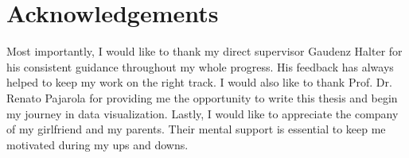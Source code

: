 \documentclass[11pt, a4paper,oneside,chapterprefix=false]{scrbook}
\begin{document}
\chapter*{Acknowledgements}
Most importantly, I would like to thank my direct supervisor Gaudenz Halter for his consistent guidance throughout my whole progress. His feedback has always helped to keep my work on the right track. I would also like to thank Prof. Dr. Renato
Pajarola for providing me the opportunity to write this thesis and begin my journey in data visualization. Lastly, I would like to appreciate the company of my girlfriend and my parents. Their mental support is essential to keep me motivated during my ups and downs.




\listoffigures
\listoftables
\end{document}

